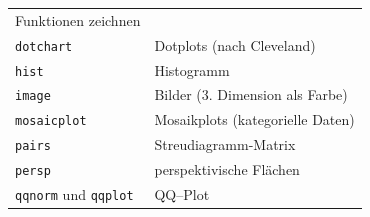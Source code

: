 \documentclass[]{book}
\begin{document}
\begin{longtable}[]{@{}ll@{}}
\begin{minipage}[t]{0.56\columnwidth}
Funktionen zeichnen\strut
\end{minipage}\tabularnewline
\begin{minipage}[t]{0.38\columnwidth}\raggedright
\texttt{dotchart}\strut
\end{minipage} & \begin{minipage}[t]{0.56\columnwidth}\raggedright
Dotplots (nach Cleveland)\strut
\end{minipage}\tabularnewline
\begin{minipage}[t]{0.38\columnwidth}\raggedright
\texttt{hist}\strut
\end{minipage} & \begin{minipage}[t]{0.56\columnwidth}\raggedright
Histogramm\strut
\end{minipage}\tabularnewline
\begin{minipage}[t]{0.38\columnwidth}\raggedright
\texttt{image}\strut
\end{minipage} & \begin{minipage}[t]{0.56\columnwidth}\raggedright
Bilder (3. Dimension als Farbe)\strut
\end{minipage}\tabularnewline
\begin{minipage}[t]{0.38\columnwidth}\raggedright
\texttt{mosaicplot}\strut
\end{minipage} & \begin{minipage}[t]{0.56\columnwidth}\raggedright
Mosaikplots (kategorielle Daten)\strut
\end{minipage}\tabularnewline
\begin{minipage}[t]{0.38\columnwidth}\raggedright
\texttt{pairs}\strut
\end{minipage} & \begin{minipage}[t]{0.56\columnwidth}\raggedright
Streudiagramm-Matrix\strut
\end{minipage}\tabularnewline
\begin{minipage}[t]{0.38\columnwidth}\raggedright
\texttt{persp}\strut
\end{minipage} & \begin{minipage}[t]{0.56\columnwidth}\raggedright
perspektivische Flächen\strut
\end{minipage}\tabularnewline
\begin{minipage}[t]{0.38\columnwidth}\raggedright
\texttt{qqnorm} und \texttt{qqplot}\strut
\end{minipage} & \begin{minipage}[t]{0.56\columnwidth}\raggedright
QQ--Plot\strut
\end{minipage}\tabularnewline
\bottomrule
\end{longtable}
\end{document}

